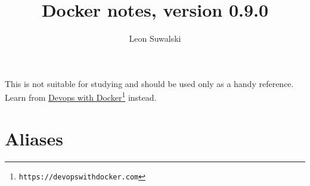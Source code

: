 \documentclass{charun}
\title{Docker notes, version 0.9.0}
\author{Leon Suwalski}
\begin{document}
\begin{multicols}{2}
\maketitle
\raggedright

This is not suitable for studying and should be used only as a handy reference.
Learn from \href{https://devopswithdocker.com}{Devops with Docker}\footnote{\texttt{https://devopswithdocker.com}} instead.










\section{Aliases}


\end{multicols}
\end{document}
